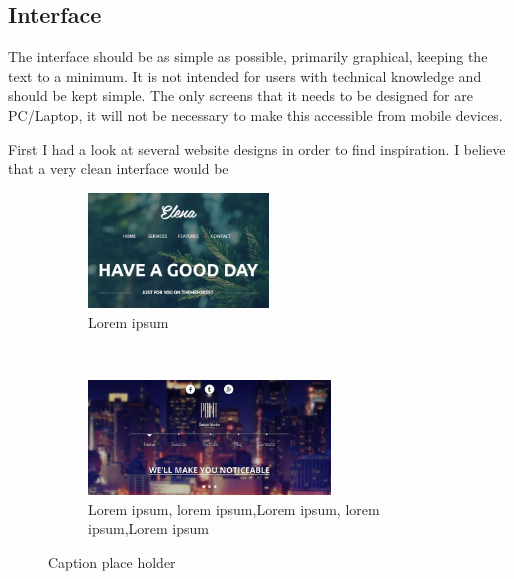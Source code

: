 \documentclass[]{article}
\begin{document}
\subsection{Interface}
The interface should be as simple as possible, primarily graphical, keeping the text to a minimum. It is not intended for users with technical knowledge and should be kept simple. The only screens that it needs to be designed for are PC/Laptop, it will not be necessary to make this accessible from mobile devices. 

First I had a look at several website designs in order to find inspiration. I believe that a very clean interface would be 

\begin{figure}[t!]
	\centering
	\begin{subfigure}
		\centering
		\includegraphics[height=1.2in]{Images/idea1}
		\caption{Lorem ipsum}
	\end{subfigure}%
	~ 
	\begin{subfigure}
		\centering
		\includegraphics[height=1.2in]{Images/idea2}
		\caption{Lorem ipsum, lorem ipsum,Lorem ipsum, lorem ipsum,Lorem ipsum}
	\end{subfigure}
	\caption{Caption place holder}
\end{figure}
\end{document}
